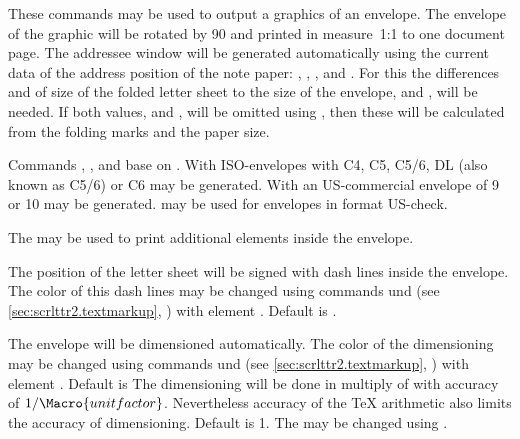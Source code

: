 \begin{Declaration}
\end{Declaration}
These commands may be used to output a graphics of an envelope. The envelope
of the graphic will be rotated by 90\textdegree{} and printed in measure~1:1
to one document page. The addressee window will be generated automatically
using the current data of the address position of the note paper:
, , , and
. For this the differences  and
 of size of the folded letter sheet to the size of the
envelope,  and , will be needed. If both values,
 and , will be omitted using
, then these will be calculated from the folding marks and
the paper size.

Commands , , and
 base on . With 
ISO-envelopes with  C4, C5, C5/6, DL (also known as C5/6) or C6
may be generated. With  an US-commercial envelope of
 9 or 10 may be generated.  may be used for
envelopes in format US-check.

The  may be used to print additional elements inside the
envelope.

%
The position of the letter sheet will be signed with dash lines inside the
envelope. The color of this dash lines may be changed using commands
 und 
(see \autoref{sec:scrlttr2.textmarkup},
) with element
. Default is
.%
%
%

%
The envelope will be dimensioned automatically. The color of the dimensioning
may be changed using commands  und
 (see \autoref{sec:scrlttr2.textmarkup},
) with element
. Default is
 The dimensioning will be done in multiply of
 with accuracy of $1/\Macro{unitfactor}$. Nevertheless
accuracy of the \TeX{} arithmetic also limits the accuracy of
dimensioning. Default is 1. The  may be changed using
.%
%

